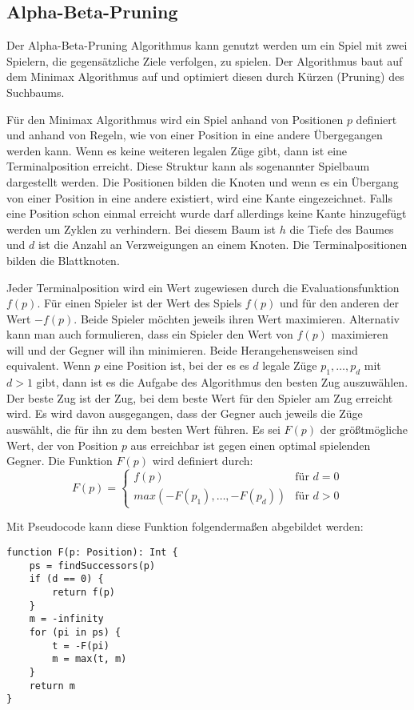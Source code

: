 \subsection{Alpha-Beta-Pruning}
Der Alpha-Beta-Pruning Algorithmus kann genutzt werden um ein Spiel mit zwei Spielern, die gegensätzliche Ziele verfolgen, zu spielen. Der Algorithmus baut auf dem Minimax Algorithmus auf und optimiert diesen durch Kürzen (Pruning) des Suchbaums.

Für den Minimax Algorithmus wird ein Spiel anhand von Positionen $p$ definiert und anhand von Regeln, wie von einer Position in eine andere Übergegangen werden kann. Wenn es keine weiteren legalen Züge gibt, dann ist eine Terminalposition erreicht. Diese Struktur kann als sogenannter Spielbaum dargestellt werden. Die Positionen bilden die Knoten und wenn es ein Übergang von einer Position in eine andere existiert, wird eine Kante eingezeichnet. Falls eine Position schon einmal erreicht wurde darf allerdings keine Kante hinzugefügt werden um Zyklen zu verhindern. Bei diesem Baum ist $h$ die Tiefe des Baumes und $d$ ist die Anzahl an Verzweigungen an einem Knoten. Die Terminalpositionen bilden die Blattknoten.

Jeder Terminalposition wird ein Wert zugewiesen durch die Evaluationsfunktion $f(p)$. Für einen Spieler ist der Wert des Spiels $f(p)$ und für den anderen der Wert $-f(p)$. Beide Spieler möchten jeweils ihren Wert maximieren. Alternativ kann man auch formulieren, dass ein Spieler den Wert von $f(p)$ maximieren will und der Gegner will ihn minimieren.
Beide Herangehensweisen sind equivalent. Wenn $p$ eine Position ist, bei der es es $d$ legale Züge $p_1,\ldots,p_d$ mit $d > 1$ gibt, dann ist es die Aufgabe des Algorithmus den besten Zug auszuwählen. Der beste Zug ist der Zug, bei dem beste Wert für den Spieler am Zug erreicht wird. Es wird davon ausgegangen, dass der Gegner auch jeweils die Züge auswählt, die für ihn zu dem besten Wert führen. Es sei $F(p)$ der größtmögliche Wert, der von Position $p$ aus erreichbar ist gegen einen optimal spielenden Gegner. Die Funktion $F(p)$ wird definiert durch:
\begin{equation}
    F(p) = 
    \begin{cases}
        f(p) & \text{für } d = 0 \\
        max(-F(p_1),\ldots,-F(p_d)) & \text{für } d > 0
    \end{cases}
\end{equation}

Mit Pseudocode kann diese Funktion folgendermaßen abgebildet werden:
\begin{lstlisting}
function F(p: Position): Int {
    ps = findSuccessors(p)
    if (d == 0) {
        return f(p)
    }
    m = -infinity
    for (pi in ps) {
        t = -F(pi)
        m = max(t, m)
    }
    return m
}
\end{lstlisting}

